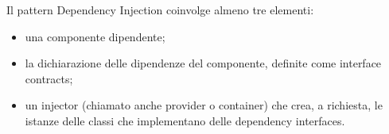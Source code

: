 Il pattern Dependency Injection coinvolge almeno tre elementi:
\begin{itemize}
\item una componente dipendente;
\item la dichiarazione delle dipendenze del componente, definite come interface contracts;
\item un injector (chiamato anche provider o container) che crea, a richiesta, le istanze delle classi che implementano delle dependency interfaces.
\end{itemize}

